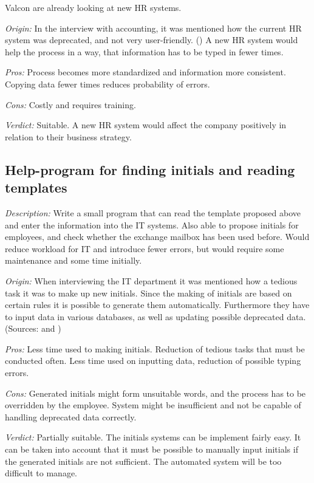 Valcon are already looking at new HR systems.

\emph{Origin:}
In the interview with accounting, it was mentioned how the current HR system was deprecated, and not very user-friendly.
()
A new HR system would help the process in a way, that information has to be typed in fewer times.

\noindent \emph{Pros:} Process becomes more standardized and information more consistent. Copying data fewer times reduces probability of errors.

\noindent \emph{Cons:} Costly and requires training.

\emph{Verdict:}
Suitable. A new HR system would affect the company positively in relation to their business strategy.

\subsection{Help-program for finding initials and reading templates}
\emph{Description:} 
Write a small program that can read the template proposed above and enter the information into the IT systems.
Also able to propose initials for employees, and check whether the exchange mailbox has been used before.
Would reduce workload for IT and introduce fewer errors, but would require some maintenance and some time initially.

\emph{Origin:}
When interviewing the IT department it was mentioned how a tedious task it was to make up new initials. Since the making of initials are based on certain rules it is possible to generate them automatically. Furthermore they have to input data in various databases, as well as updating possible deprecated data.
(Sources:  and )

\noindent \emph{Pros:} 
Less time used to making initials. Reduction of tedious tasks that must be conducted often.
Less time used on inputting data, reduction of possible typing errors.

\noindent \emph{Cons:} 
Generated initials might form unsuitable words, and the process has to be overridden by the employee.
System might be insufficient and not be capable of handling deprecated data correctly. 

\emph{Verdict:}
Partially suitable. The initials systems can be implement fairly easy. It can be taken into account that it must be possible to manually input initials if the generated initials are not sufficient.
The automated system will be too difficult to manage.

